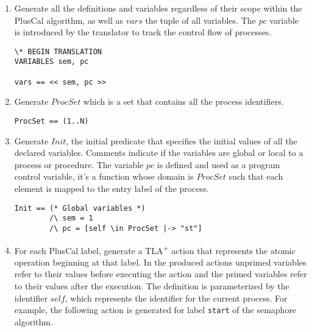 \documentclass{thesul}
\newcommand{\tlaplus}{TLA\textsuperscript{+}\xspace}
\begin{document}
\begin{enumerate}
\item Generate all the definitions and variables regardless of their scope within the PlusCal algorithm, as well as $vars$ the tuple of all variables.
The $pc$ variable is introduced by the translator to track the control flow of processes.

\FloatBarrier
\begin{lstlisting}[frame = tlrb, firstnumber = 1,xleftmargin=.2\textwidth, xrightmargin=.2\textwidth]
\* BEGIN TRANSLATION
VARIABLES sem, pc

vars == << sem, pc >>

\end{lstlisting}

\item Generate $ProcSet$ which is a set that contains all the process identifiers.

\begin{lstlisting}[frame = tlrb, firstnumber = 1,xleftmargin=.2\textwidth, xrightmargin=.2\textwidth]
ProcSet == (1..N)

\end{lstlisting}

\item  Generate $Init$, the initial predicate that specifies the initial values of all the declared variables. Comments indicate if the variables are global or local to a process or procedure.
The variable $pc$ is defined and used as a program control variable, it's a function whose domain is $ProcSet$ such that each element is mapped to the entry label of the process.

\begin{lstlisting}[frame = tlrb, firstnumber = 1, xleftmargin=.2\textwidth, xrightmargin=.2\textwidth]
Init == (* Global variables *)
        /\ sem = 1
        /\ pc = [self \in ProcSet |-> "st"]

\end{lstlisting}

\item For each PlusCal label, generate a \tlaplus action that represents the atomic operation beginning at that label. 
In the produced actions unprimed variables refer to their values before executing the action and the primed variables refer to their values after the execution.
The definition is parameterized by the identifier $self$,
which represents the identifier for the current process. For example, the following action is generated for label \texttt{start} of the semaphore algorithm.


\end{enumerate}
\end{document}
